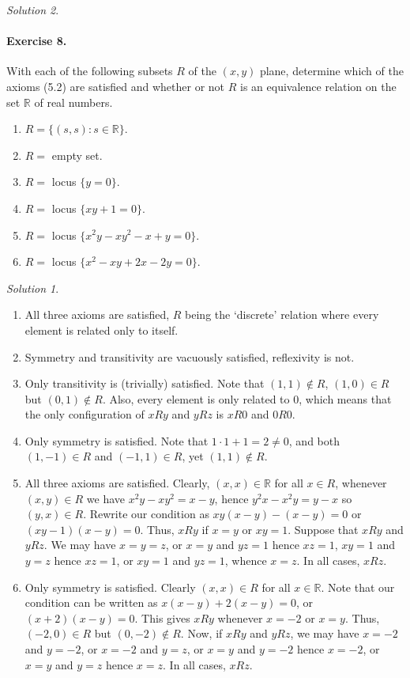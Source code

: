 \documentclass[11pt]{report}
\def\R{\mathbb{R}}
\theoremstyle{remark}
\newtheorem*{solution}{Solution}
\begin{document}
\begin{solution}
    \paragraph{Exercise 8.} With each of the following subsets $R$ of the $(x, y)$
    plane, determine which of the axioms (5.2) are satisfied and whether or not $R$
    is an equivalence relation on the set $\R$ of real numbers.
    \begin{enumerate}
        \itemsep0em
        \item $R = \{(s, s)\colon s \in \R\}$.
        \item $R = $ empty set.
        \item $R = $ locus $\{y = 0\}$.
        \item $R = $ locus $\{xy + 1 = 0\}$.
        \item $R = $ locus $\{x^2y - xy^2 - x + y = 0\}$.
        \item $R = $ locus $\{x^2 - xy + 2x - 2y = 0\}$.
    \end{enumerate}
    \begin{solution} \mbox{}
    \begin{enumerate}
        \item All three axioms are satisfied, $R$ being the `discrete' relation
        where every element is related only to itself.
        \item Symmetry and transitivity are vacuously satisfied, reflexivity is not.
        \item Only transitivity is (trivially) satisfied. Note that $(1, 1) \notin R$, $(1, 0)
        \in R$ but $(0, 1) \notin R$. Also, every element is only related to $0$,
        which means that the only configuration of $xRy$ and $yRz$ is $xR0$ and
        $0R0$.
        \item Only symmetry is satisfied. Note that $1\cdot 1 + 1 = 2 \neq 0$, and
        both $(1, -1) \in R$ and $(-1, 1) \in R$, yet $(1, 1) \notin R$.
        \item All three axioms are satisfied. Clearly, $(x, x) \in \R$ for all $x
        \in R$, whenever $(x, y) \in R$ we have $x^2y - xy^2 = x - y$, hence $y^2x -
        x^2y = y - x$ so $(y, x) \in R$. Rewrite our condition as $xy(x - y) - (x -
        y) = 0$ or $(xy - 1)(x - y) = 0$. Thus, $xRy$ if $x = y$ or $xy = 1$.
        Suppose that $xRy$ and $yRz$. We may have $x = y = z$, or $x = y$ and $yz =
        1$ hence $xz = 1$, $xy = 1$ and $y = z$ hence $xz = 1$, or $xy = 1$ and $yz
        = 1$, whence $x = z$. In all cases, $xRz$.
        \item Only symmetry is satisfied. Clearly $(x, x) \in R$ for all $x \in \R$.
        Note that our condition can be written as $x(x - y) + 2(x - y) = 0$, or $(x
        + 2)(x - y) = 0$. This gives $xRy$ whenever $x = -2$ or $x = y$. Thus, $(-2,
        0) \in R$ but $(0, -2) \notin R$. Now, if $xRy$ and $yRz$, we may have $x =
        -2$ and $y = -2$, or $x = -2$ and $y = z$, or $x = y$ and $y = -2$ hence $x
        = -2$, or $x = y$ and $y = z$ hence $x = z$. In all cases, $xRz$.
    \end{enumerate}
    \end{solution}


\end{solution}
\end{document}
